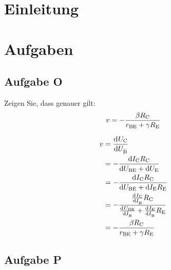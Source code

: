 \newpage
\tableofcontents

\listoftodo
\newpage


\FloatBarrier
\section{Einleitung}



\FloatBarrier
\section{Aufgaben}

\FloatBarrier
\subsection{Aufgabe O}

\begin{problem}
    Zeigen Sie, dass genauer gilt:
    \begin{equation}
        \label{eq:3_4-14}
        v = - \frac{\beta R_\text{C}}{r_\text{BE} + \gamma R_\text{E}}
    \end{equation}
\end{problem}

\begin{align*}
    v &= \dod \UC\UB\\
      &= -\frac{\dif\IC\RC}{\dif\UBE + \dif\UE}\\
      &= -\frac{\dif\IC\RC}{\dif\UBE + \dif\IE\RE}\\
      &= -\frac{\od\IC\IB\RC}{\od\UBE\IB+\od\IE\IB\RE}\\
      &= -\frac{\beta\RC}{r_\text{BE}+\gamma\RE}
\end{align*}

\FloatBarrier
\subsection{Aufgabe P}

